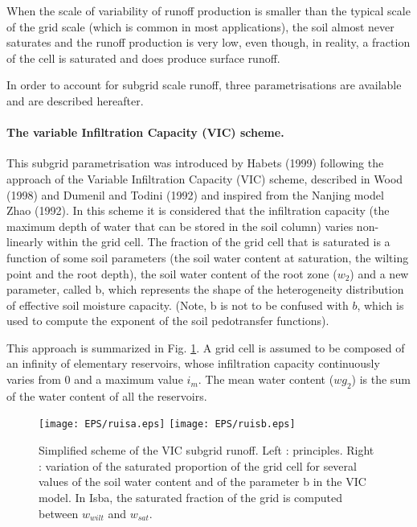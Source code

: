 When the scale of variability of runoff production is smaller than the typical scale
of the grid scale (which is common in most applications), the soil almost never 
saturates and the runoff production is very low, even though, in reality, 
a fraction of the cell is saturated and does produce surface
runoff.

In order to account for subgrid scale runoff, three parametrisations are available and
are described hereafter.

 
\paragraph{The variable Infiltration Capacity (VIC) scheme.}    
%
This subgrid parametrisation was introduced by Habets \etal (1999)\nocite{Habets1999} 
following the approach of the Variable Infiltration Capacity (VIC) scheme,
described in Wood \etal (1998)\nocite{Wood1998} and Dumenil and Todini (1992)\nocite{Dumenil1992} and inspired from the
Nanjing model Zhao (1992)\nocite{Zhao1992}.
In this scheme it is considered that the infiltration capacity (the maximum depth of
water that can be stored in the soil column) varies non-linearly within the grid cell.
The fraction of the grid cell that is saturated is a function of some soil parameters (the
soil water content at saturation, the wilting point and the root depth), the soil water
content of the root zone ($w_2$) and a new parameter, called b, which represents the
shape of the heterogeneity distribution of effective soil moisture
capacity. 
(Note, b is not to be confused with $b$, which is used to compute the
exponent of the soil pedotransfer functions).

This approach is summarized in Fig. \ref{fig:vic}. A grid cell is assumed to be composed of 
an infinity of elementary reservoirs, whose infiltration capacity continuously varies
from 0 and a maximum value $i_m$. The mean water content ($wg_2$) is the sum of
the water content of all the reservoirs.

\begin{figure}[!b]
\centerline{
\texttt{[image: EPS/ruisa.eps]}
\texttt{[image: EPS/ruisb.eps]}}
\caption{
Simplified scheme of the VIC subgrid runoff.
Left : principles. Right : variation of the saturated proportion of
the grid cell for several values of the soil water content and of the
parameter b in the VIC model. In Isba, the saturated fraction of the
grid is computed between $w_{wilt}$ and $w_{sat}$.
}
\label{fig:vic}
\end{figure}

